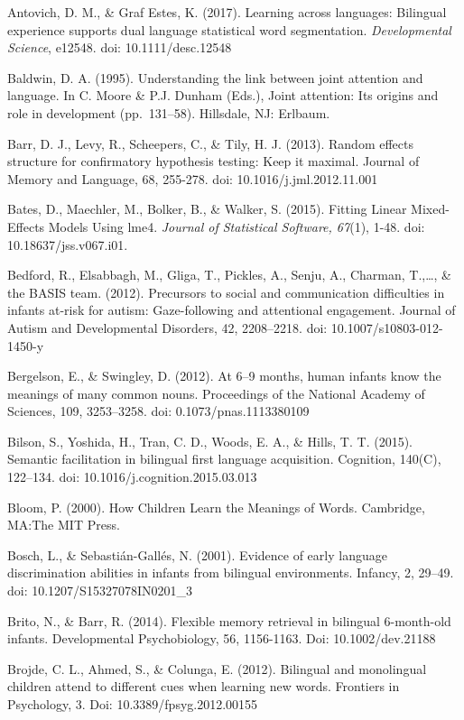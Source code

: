 \documentclass[,man,floatsintext]{apa6}
\begin{document}
Antovich, D. M., \& Graf Estes, K. (2017). Learning across languages: Bilingual experience supports dual language statistical word segmentation. \emph{Developmental Science}, e12548. doi: 10.1111/desc.12548

Baldwin, D. A. (1995). Understanding the link between joint attention and language. In C. Moore \& P.J. Dunham (Eds.), Joint attention: Its origins and role in development (pp.~131--58). Hillsdale, NJ: Erlbaum.

Barr, D. J., Levy, R., Scheepers, C., \& Tily, H. J. (2013). Random effects structure for confirmatory hypothesis testing: Keep it maximal. Journal of Memory and Language, 68, 255-278. doi: 10.1016/j.jml.2012.11.001

Bates, D., Maechler, M., Bolker, B., \& Walker, S. (2015). Fitting Linear Mixed-Effects Models Using lme4. \emph{Journal of Statistical Software, 67}(1), 1-48. doi: 10.18637/jss.v067.i01.

Bedford, R., Elsabbagh, M., Gliga, T., Pickles, A., Senju, A., Charman, T.,\ldots{}, \& the BASIS team. (2012). Precursors to social and communication difficulties in infants at-risk for autism: Gaze-following and attentional engagement. Journal of Autism and Developmental Disorders, 42, 2208--2218. doi: 10.1007/s10803-012-1450-y

Bergelson, E., \& Swingley, D. (2012). At 6--9 months, human infants know the meanings of many common nouns. Proceedings of the National Academy of Sciences, 109, 3253--3258. doi: 0.1073/pnas.1113380109

Bilson, S., Yoshida, H., Tran, C. D., Woods, E. A., \& Hills, T. T. (2015). Semantic facilitation in bilingual first language acquisition. Cognition, 140(C), 122--134. doi: 10.1016/j.cognition.2015.03.013

Bloom, P. (2000). How Children Learn the Meanings of Words. Cambridge, MA:The MIT Press.

Bosch, L., \& Sebastián-Gallés, N. (2001). Evidence of early language discrimination abilities in infants from bilingual environments. Infancy, 2, 29--49. doi: 10.1207/S15327078IN0201\_3

Brito, N., \& Barr, R. (2014). Flexible memory retrieval in bilingual 6-month-old infants. Developmental Psychobiology, 56, 1156-1163. Doi: 10.1002/dev.21188

Brojde, C. L., Ahmed, S., \& Colunga, E. (2012). Bilingual and monolingual children attend to different cues when learning new words. Frontiers in Psychology, 3. Doi: 10.3389/fpsyg.2012.00155
\end{document}
